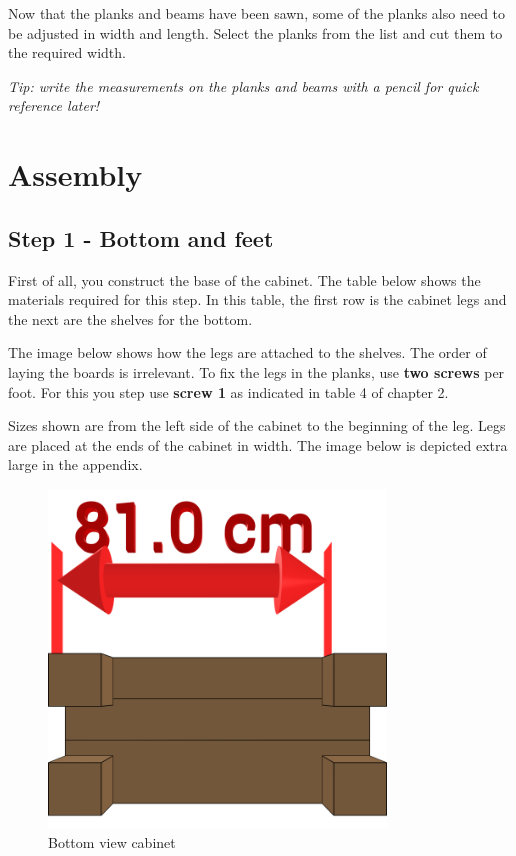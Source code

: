 \documentclass{article}
\begin{document}
Now that the planks and beams have been sawn, some of the planks also need to be adjusted in width and length. Select the planks from the list and cut them to the required width. \\

\begin{center}
    \textit{Tip: write the measurements on the planks and beams with a pencil for quick reference later!}
\end{center}



\clearpage
\newpage

\section{Assembly}

\subsection{Step 1 - Bottom and feet}

First of all, you construct the base of the cabinet. The table below shows the materials required for this step. In this table, the first row is the cabinet legs and the next are the shelves for the bottom.



The image below shows how the legs are attached to the shelves. The order of laying the boards is irrelevant. To fix the legs in the planks, use \textbf{two screws} per foot. For this you step use \textbf{screw 1} as indicated in table 4 of chapter 2.

Sizes shown are from the left side of the cabinet to the beginning of the leg. Legs are placed at the ends of the cabinet in width. The image below is depicted extra large in the appendix.

\begin{figure}[h!]
    \centering
    \includegraphics[width=0.8\textwidth]{scene 1 - bottom.png}
    \caption{Bottom view cabinet}
    \label{fig:stap 1}
\end{figure}
\end{document}
